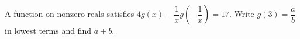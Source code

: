 A function on nonzero reals satisfies $4g(x)-\dfrac{1}{x}g(-\dfrac{1}{x})=17$. Write $g(3)=\dfrac{a}{b}$ in lowest terms and find $a+b$.
